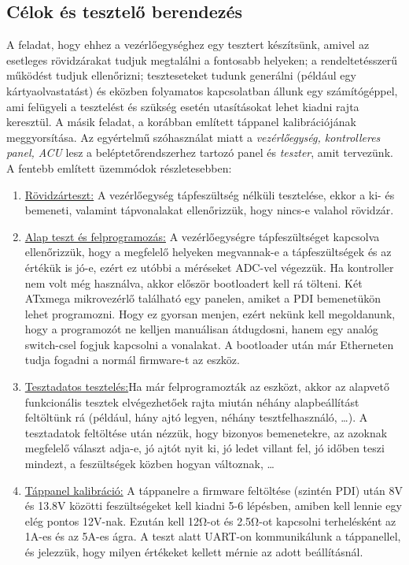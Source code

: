 \documentclass[a4paper, 12pt]{article}
\newcommand{\tab}{\hspace*{1em}}
\begin{document}
\subsection{Célok és tesztelő berendezés}
\tab A feladat, hogy ehhez a vezérlőegységhez egy tesztert készítsünk, amivel az esetleges rövidzárakat tudjuk megtalálni a fontosabb helyeken; a rendeltetésszerű működést tudjuk ellenőrizni; teszteseteket tudunk generálni (például egy kártyaolvastatást) és eközben folyamatos kapcsolatban állunk egy számítógéppel, ami felügyeli a tesztelést és szükség esetén utasításokat lehet kiadni rajta keresztül. A másik feladat, a korábban említett táppanel kalibrációjának meggyorsítása. Az egyértelmű szóhasználat miatt a \emph{vezérlőegység, kontrolleres panel, ACU} lesz a beléptetőrendszerhez tartozó panel és \emph{teszter}, amit tervezünk.\\
A fentebb említett üzemmódok részletesebben:
\begin{enumerate}
\item \underline{Rövidzárteszt:} A vezérlőegység tápfeszültség nélküli tesztelése, ekkor a ki- és bemeneti, valamint tápvonalakat ellenőrizzük, hogy nincs-e valahol rövidzár.
\item \underline{Alap teszt és felprogramozás:} A vezérlőegységre tápfeszültséget kapcsolva ellenőrizzük, hogy a megfelelő helyeken megvannak-e a tápfeszültségek és az értékük is jó-e, ezért ez utóbbi a méréseket ADC-vel végezzük. Ha kontroller nem volt még használva, akkor először bootloadert kell rá tölteni. Két ATxmega mikrovezérlő található egy panelen, amiket a PDI bemenetükön lehet programozni. Hogy ez gyorsan menjen, ezért nekünk kell megoldanunk, hogy a programozót ne kelljen manuálisan átdugdosni, hanem egy analóg switch-csel fogjuk kapcsolni a vonalakat. A bootloader után már Etherneten tudja fogadni a normál firmware-t az eszköz.
\item \underline{Tesztadatos tesztelés:}Ha már felprogramozták az eszközt, akkor az alapvető funkcionális tesztek elvégezhetőek rajta miután néhány alapbeállítást feltöltünk rá (például, hány ajtó legyen, néhány tesztfelhasználó, \dots). A tesztadatok feltöltése után nézzük, hogy bizonyos bemenetekre, az azoknak megfelelő választ adja-e, jó ajtót nyit ki, jó ledet villant fel, jó időben teszi mindezt, a feszültségek közben hogyan változnak, \dots
\item \underline{Táppanel kalibráció:} A táppanelre a firmware feltöltése (szintén PDI) után 8V és 13.8V közötti feszültségeket kell kiadni 5-6 lépésben, amiben kell lennie egy elég pontos 12V-nak. Ezután kell 12\si{\ohm}-ot és 2.5\si{\ohm}-ot kapcsolni terhelésként az 1A-es és az 5A-es ágra. A teszt alatt UART-on kommunikálunk a táppanellel, és jelezzük, hogy milyen értékeket kellett mérnie az adott beállításnál.
\end{enumerate}
\end{document}
